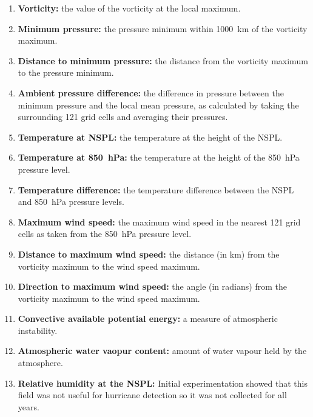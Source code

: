 \documentclass[pdftex,12pt,a4paper]{report}
\begin{document}
\begin{enumerate}
   \item \textbf{Vorticity:} the value of the vorticity at the local maximum.
    \item \textbf{Minimum pressure:} the pressure minimum within \SI{1000}{km} of the vorticity
        maximum.
    \item \textbf{Distance to minimum pressure:} the distance from the vorticity maximum to the
        pressure minimum.
    \item \textbf{Ambient pressure difference:} the difference in pressure between the minimum
        pressure and the local mean pressure, as calculated by taking the surrounding 121 grid cells
        and averaging their pressures.
    \item \textbf{Temperature at NSPL:} the temperature at the height of the NSPL.
    \item \textbf{Temperature at \SI{850}{hPa}:} the temperature at the height of the \SI{850}{hPa}
        pressure level.
    \item \textbf{Temperature difference:} the temperature difference between the NSPL and
        \SI{850}{hPa} pressure levels.
    \item \textbf{Maximum wind speed:} the maximum wind speed in the nearest 121 grid cells as taken
        from the \SI{850}{hPa} pressure level.
    \item \textbf{Distance to maximum wind speed:} the distance (in km) from the vorticity
        maximum to the wind speed maximum.
    \item \textbf{Direction to maximum wind speed:} the angle (in radians) from the vorticity
        maximum to the wind speed maximum.
    \item \textbf{Convective available potential energy:} a measure of atmospheric instability.
    \item \textbf{Atmospheric water vaopur content:} amount of water vapour held by the atmosphere.
    \item \textbf{Relative humidity at the NSPL:} Initial experimentation showed that this field was
        not useful for hurricane detection so it was not collected for all years.
\end{enumerate}
\end{document}
